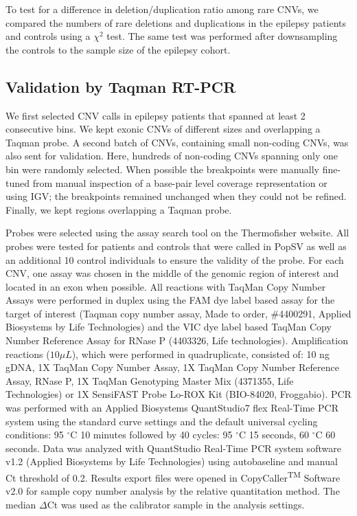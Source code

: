 To test for a difference in deletion/duplication ratio among rare CNVs, we compared the numbers of rare deletions and duplications in the epilepsy patients and controls using a $\chi^2$ test.
The same test was performed after downsampling the controls to the sample size of the epilepsy cohort.

\subsection*{Validation by Taqman RT-PCR}
We first selected CNV calls in epilepsy patients that spanned at least 2 consecutive bins.
We kept exonic CNVs of different sizes and overlapping a Taqman probe.
A second batch of CNVs, containing small non-coding CNVs, was also sent for validation.
Here, hundreds of non-coding CNVs spanning only one bin were randomly selected.
When possible the breakpoints were manually fine-tuned from manual inspection of a base-pair level coverage representation or using {\sf IGV}\cite{Thorvaldsdottir2013}; the breakpoints remained unchanged when they could not be refined.
Finally, we kept regions overlapping a Taqman probe.

Probes were selected using the assay search tool on the Thermofisher website.
All probes were tested for patients and controls that were called in {\sf PopSV} as well as an additional 10 control individuals to ensure the validity of the probe.
For each CNV, one assay was chosen in the middle of the genomic region of interest and located in an exon when possible.
All reactions with TaqMan Copy Number Assays were performed in duplex using the FAM dye label based assay for the target of interest (Taqman copy number assay, Made to order, \#4400291, Applied Biosystems by Life Technologies) and the VIC dye label based TaqMan Copy Number Reference Assay for RNase P (4403326, Life technologies).
Amplification reactions ($10\mu L$), which were performed in quadruplicate, consisted of: 10 ng gDNA, 1X TaqMan Copy Number Assay, 1X TaqMan Copy Number Reference Assay, RNase P, 1X TaqMan Genotyping Master Mix (4371355, Life Technologies) or 1X SensiFAST Probe Lo-ROX Kit (BIO-84020, Froggabio).
PCR was performed with an Applied Biosystems QuantStudio7 flex Real-Time PCR system using the standard curve settings and the default universal cycling conditions: 95 $^{\circ}$C 10 minutes followed by 40 cycles: 95 $^{\circ}$C 15 seconds, 60 $^{\circ}$C 60 seconds.
Data was analyzed with QuantStudio Real-Time PCR system software v1.2 (Applied Biosystems by Life Technologies) using autobaseline and manual Ct threshold of 0.2.
Results export files were opened in CopyCaller\textsuperscript{TM} Software v2.0 for sample copy number analysis by the relative quantitation method.
The median $\Delta$Ct was used as the calibrator sample in the analysis settings.

